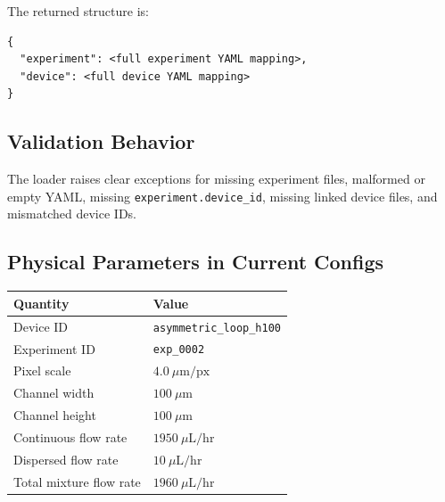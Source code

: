 The returned structure is:

\begin{verbatim}
{
  "experiment": <full experiment YAML mapping>,
  "device": <full device YAML mapping>
}
\end{verbatim}

\subsection{Validation Behavior}

The loader raises clear exceptions for missing experiment files, malformed or
empty YAML, missing \texttt{experiment.device\_id}, missing linked device
files, and mismatched device IDs.

\subsection{Physical Parameters in Current Configs}

\begin{longtable}{@{}ll@{}}
\toprule
Quantity & Value \\
\midrule
Device ID & \texttt{asymmetric\_loop\_h100} \\
Experiment ID & \texttt{exp\_0002} \\
Pixel scale & \(4.0~\mu\mathrm{m}/\mathrm{px}\) \\
Channel width & \(100~\mu\mathrm{m}\) \\
Channel height & \(100~\mu\mathrm{m}\) \\
Continuous flow rate & \(1950~\mu\mathrm{L}/\mathrm{hr}\) \\
Dispersed flow rate & \(10~\mu\mathrm{L}/\mathrm{hr}\) \\
Total mixture flow rate & \(1960~\mu\mathrm{L}/\mathrm{hr}\) \\
\bottomrule
\end{longtable}
